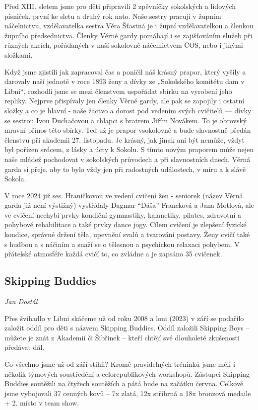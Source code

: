 Před XIII. sletem jsme pro děti připravili 2 zpěvníčky sokolských a
lidových písniček, první ke sletu a druhý rok nato. Naše sestry pracují
v župním náčelnictvu, vzdělavatelka sestra Věra Šťastná je i župní
vzdělavatelkou a členkou župního předsednictva. Členky Věrné gardy
pomáhají i se zajišťováním služeb při různých akcích, pořádaných v naší
sokolovně náčelnictvem ČOS, nebo i jinými složkami.

Když jsme zjistili jak zapracoval čas a poničil náš krásný prapor, který
vyšily a darovaly naší jednotě v roce 1893 ženy a dívky ze „Sokolského
komitétu dam v Libni``, rozhodli jsme se mezi členstvem uspořádat sbírku
na vyrobení jeho repliky. Nejprve přispívaly jen členky Věrné gardy, ale
pak se zapojily i ostatní složky a co je hlavní - naše žactvo a dorost
pod vedením svých cvičitelů --- dívky se sestrou Ivou Duchačovou a
chlapci s bratrem Jiřím Novákem. To je obrovský mravní přínos této
sbírky. Teď už je prapor vsokolovně a bude slavnostně předán členstvu
při akademii 27. listopadu. Je krásný, jak jinak ani být nemůže, vždyť
byl pořízen srdcem, z lásky a úcty k Sokolu. S tímto novým praporem může
nejen naše mládež pochodovat v sokolských průvodech a při slavnostních
dnech. Věrná garda si přeje, aby to bylo vždy jen při radostných
událostech, v míru a k slávě Sokola.

V roce 2024 již ses. Hraničkovou ve vedení cvičení žen - seniorek (název
Věrná garda již není výstižný) vystřídaly Dagmar ``Dáša'' Francková a
Jana Motlová, ale ve cvičení nechybí prvky kondiční gymnastiky,
kalanetiky, pilates, zdravotní a pohybové rehabilitace a také prvky
dance jogy. Cílem cvičení je zlepšení fyzické kondice, správné držení
těla, upevnění svalů a tvarování postavy. Ženy cvičí také s hudbou a s
náčiním a snaží se o tělesnou a psychickou relaxaci pohybem. V přátelské
atmosféře každá cvičí to, co zvládne a je zapsáno 35 cvičenek.

\subsection{Skipping Buddies}\label{skipping-buddies}

\emph{Jan Dostál}

Přes švihadlo v Libni skáčeme už od roku 2008 a loni (2023) v září se
podařilo založit oddíl pro děti s názvem Skipping Buddies. Oddíl
založili Skipping Boys -- můžete je znát z Akademií či Šibřinek -- kteří
chtějí své dlouholeté zkušenosti předávat dál.

Co všechno jsme už od září stihli? Kromě pravidelných tréninků jsme měli
i několik týmových soustředění a celorepublikových workshopů. Zástupci
Skipping Buddies soutěžili na čtyřech soutěžích a pátá bude na začátku
června. Celkově jsme vybojovali 37 cenných kovů -- 7x zlatá, 12x
stříbrná a 18x bronzová medaile + 2. místo v team show.

